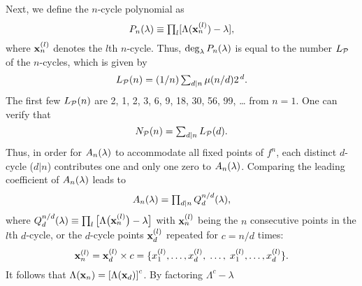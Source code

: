 \documentclass{ws-ijbc}
\begin{document}
Next, we define the $n$-cycle polynomial as
\begin{equation}
  P_n(\lambda) \equiv \textstyle\prod_l [
    \Lambda(\mathbf{x}_{n}^{(l)}) - \lambda
  ],
\notag
\end{equation}
where $\mathbf{x}_{n}^{(l)}$ denotes the $l$th $n$-cycle.
%
Thus, $\deg_\lambda P_n(\lambda)$
  is equal to the number $L_\mathcal P$ of the $n$-cycles,
  which is given by
  \cite{hao, hao2, lutzky}
\begin{equation}
  L_\mathcal P(n) = (1/n)\textstyle\sum_{d | n} \mu(n/d) 2^{\,d}.
\label{eq:lyndon}
\end{equation}
%
%
%
The first few $L_\mathcal P(n)$ are
2, 1, 2, 3, 6, 9, 18, 30, 56, 99, \dots %
from $n = 1$.
%
%
One can verify that
\begin{equation}
  N_\mathcal P(n) = \textstyle\sum_{d|n} L_\mathcal P(d).
\notag
\end{equation}
%
Thus, in order for $A_n(\lambda)$ to accommodate all fixed points of $f^n$,
  each distinct $d$-cycle ($d|n$)
  contributes one and only one zero to $A_n(\lambda)$.
%
%
Comparing the leading coefficient of $A_n(\lambda)$ leads to
  \begin{equation}
    A_n(\lambda) = \textstyle\prod_{d|n} Q_d^{n/d}(\lambda),
    \label{eq:prod}
  \end{equation}
where $Q_d^{n/d}(\lambda) \equiv \prod_l
  \big[\Lambda\big(\mathbf{x}_{n}^{(l)}\big) - \lambda\big]$
  with $\mathbf{x}_{n}^{(l)}$ being the $n$ consecutive points
  in the $l$th $d$-cycle,
%
  or the $d$-cycle points $\mathbf{x}_{d}^{(l)}$
  repeated for $c = n/d$ times:
\begin{equation}
  \mathbf{x}_{n}^{(l)}
  =
  \mathbf{x}_{d}^{(l)} \times c
  =
  \{
    x_1^{(l)}, \ldots, x_d^{(l)},
    \; \ldots, \;
    x_1^{(l)}, \ldots, x_d^{(l)}
  \}.
\notag
\end{equation}
%
It follows that
$\Lambda(\mathbf{x}_{n}) = \left[ \Lambda(\mathbf{x}_{d}) \right]^c$.
%
By factoring $\Lambda^c - \lambda$
\end{document}
